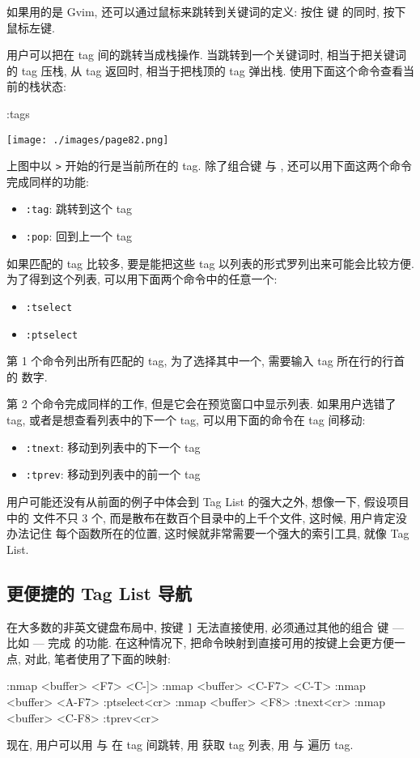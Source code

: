 \begin{warning}
    如果用的是 Gvim, 还可以通过鼠标来跳转到关键词的定义: 按住  键
    的同时, 按下鼠标左键.
\end{warning}
用户可以把在 tag 间的跳转当成栈操作. 当跳转到一个关键词时, 相当于把关键词的 tag
压栈, 从 tag 返回时, 相当于把栈顶的 tag 弹出栈.
使用下面这个命令查看当前的栈状态:
\begin{vimcode}
:tags
\end{vimcode}
\begin{center}
    \texttt{[image: ./images/page82.png]}
\end{center}
上图中以 \texttt{>} 开始的行是当前所在的 tag. 除了组合键 \key{Ctrl+]}
与 , 还可以用下面这两个命令完成同样的功能:
\begin{itemize}
    \item \texttt{:tag}: 跳转到这个 tag
    \item \texttt{:pop}: 回到上一个 tag
\end{itemize}

如果匹配的 tag 比较多, 要是能把这些 tag 以列表的形式罗列出来可能会比较方便.
为了得到这个列表, 可以用下面两个命令中的任意一个:
\begin{itemize}
    \item \texttt{:tselect}
    \item \texttt{:ptselect}
\end{itemize}
第 1 个命令列出所有匹配的 tag, 为了选择其中一个, 需要输入 tag 所在行的行首的
数字.

第 2 个命令完成同样的工作, 但是它会在预览窗口中显示列表. 如果用户选错了 tag,
或者是想查看列表中的下一个 tag, 可以用下面的命令在 tag 间移动:
\begin{itemize}
    \item \texttt{:tnext}: 移动到列表中的下一个 tag
    \item \texttt{:tprev}: 移动到列表中的前一个 tag
\end{itemize}

用户可能还没有从前面的例子中体会到 Tag List 的强大之外, 想像一下, 假设项目中的
文件不只 3 个, 而是散布在数百个目录中的上千个文件, 这时候, 用户肯定没办法记住
每个函数所在的位置, 这时候就非常需要一个强大的索引工具, 就像 Tag List.
\subsection{更便捷的 Tag List 导航}
\label{subsec:easier_taglist_navigation}

在大多数的非英文键盘布局中, 按键 \texttt{]} 无法直接使用, 必须通过其他的组合
键 --- 比如  --- 完成 \key{Ctrl+]} 的功能. 在这种情况下,
把命令映射到直接可用的按键上会更方便一点, 对此, 笔者使用了下面的映射:
\begin{vimcode}
:nmap <buffer> <F7> <C-]>
:nmap <buffer> <C-F7> <C-T>
:nmap <buffer> <A-F7> :ptselect<cr>
:nmap <buffer> <F8> :tnext<cr>
:nmap <buffer> <C-F8> :tprev<cr>
\end{vimcode}
现在, 用户可以用  与  在 tag 间跳转, 用 
获取 tag 列表, 用  与  遍历 tag.

